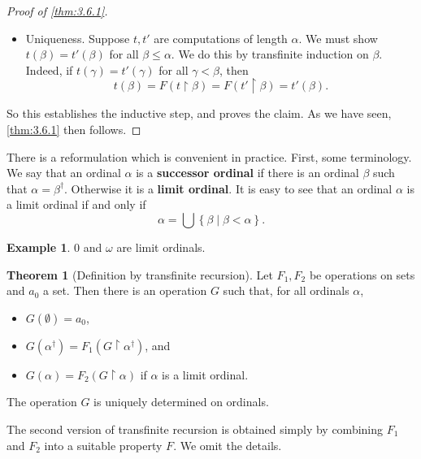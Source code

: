 \documentclass{article}
\newcommand{\rb}[1]{\left( #1 \right)}
\newcommand{\cb}[1]{\left\{ #1 \right\}}
\theoremstyle{definition}\newtheorem{definition}{Definition}[subsection]
\theoremstyle{definition}\newtheorem{remark1}[definition]{Remark}
\theoremstyle{definition}\newtheorem{example1}[definition]{Example}
\theoremstyle{definition}\newtheorem*{remark2}{Remark}
\theoremstyle{definition}\newtheorem*{example2}{Example}
\theoremstyle{definition}\newtheorem*{note}{Note}
\theoremstyle{definition}\newtheorem*{notation}{Notation}
\newtheorem{theorem}[definition]{Theorem}
\begin{document}
\begin{proof}[Proof of \ref{thm:3.6.1}]
\begin{itemize}
for all $ \beta < \alpha $. We extend $ s $ to a function $ t $ with domain $ \alpha^\dagger $ by setting $ t\rb{\alpha} = F\rb{s} $. Then for all $ \beta \le \alpha $, we have that $ t\rb{\beta} = F\rb{t \upharpoonright \beta} $. So $ t $ is a computation of length $ \alpha $ based on $ F $.
\item Uniqueness. Suppose $ t, t' $ are computations of length $ \alpha $. We must show $ t\rb{\beta} = t'\rb{\beta} $ for all $ \beta \le \alpha $. We do this by transfinite induction on $ \beta $. Indeed, if $ t\rb{\gamma} = t'\rb{\gamma} $ for all $ \gamma < \beta $, then
$$ t\rb{\beta} = F\rb{t \upharpoonright \beta} = F\rb{t' \upharpoonright \beta} = t'\rb{\beta}. $$
\end{itemize}
So this establishes the inductive step, and proves the claim. As we have seen, \ref{thm:3.6.1} then follows.
\end{proof}

There is a reformulation which is convenient in practice. First, some terminology. We say that an ordinal $ \alpha $ is a \textbf{successor ordinal} if there is an ordinal $ \beta $ such that $ \alpha = \beta^\dagger $. Otherwise it is a \textbf{limit ordinal}. It is easy to see that an ordinal $ \alpha $ is a limit ordinal if and only if
$$ \alpha = \bigcup \cb{\beta \mid \beta < \alpha}. $$

\begin{example2}
$ 0 $ and $ \omega $ are limit ordinals.
\end{example2}

\begin{theorem}[Definition by transfinite recursion]
Let $ F_1, F_2 $ be operations on sets and $ a_0 $ a set. Then there is an operation $ G $ such that, for all ordinals $ \alpha $,
\begin{itemize}
\item $ G\rb{\emptyset} = a_0 $,
\item $ G\rb{\alpha^\dagger} = F_1\rb{G \upharpoonright \alpha^\dagger} $, and
\item $ G\rb{\alpha} = F_2\rb{G \upharpoonright \alpha} $ if $ \alpha $ is a limit ordinal.
\end{itemize}
The operation $ G $ is uniquely determined on ordinals.
\end{theorem}

The second version of transfinite recursion is obtained simply by combining $ F_1 $ and $ F_2 $ into a suitable property $ F $. We omit the details.
\end{document}
